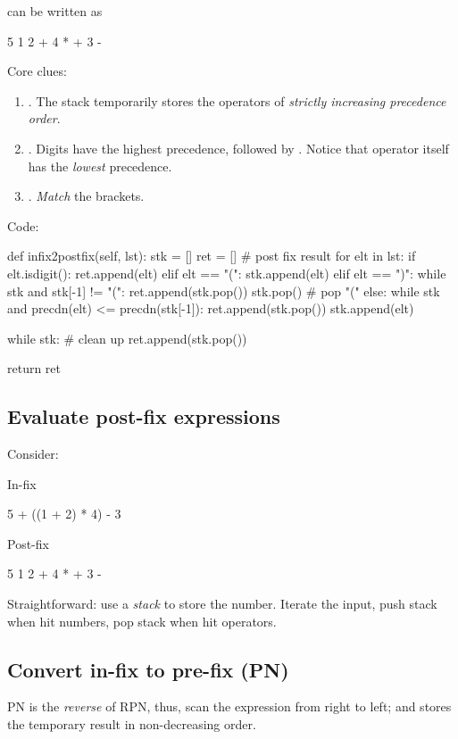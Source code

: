 can be written as
\begin{python}
5 1 2 + 4 * + 3 - 
\end{python}
Core clues:
\begin{enumerate}
\item {}. The stack temporarily stores the operators of \textit{strictly increasing precedence order}.
\item {}. Digits have the highest precedence, followed by \pyinline{*, /, +, (}. Notice that \pyinline{(} operator itself has the \textit{lowest} precedence.
\item {}. \textit{Match} the brackets. 
\end{enumerate}
Code:
\begin{python}
def infix2postfix(self, lst):
  stk = []
  ret = []  # post fix result
  for elt in lst:
    if elt.isdigit():
      ret.append(elt)
    elif elt == "(":
      stk.append(elt)
    elif elt == ")":
      while stk and stk[-1] != "(":
        ret.append(stk.pop())
      stk.pop()  # pop "("
    else:
      while stk and precdn(elt) <= precdn(stk[-1]):
        ret.append(stk.pop())
      stk.append(elt)

  while stk:  # clean up 
    ret.append(stk.pop())

  return ret
\end{python}

\subsection{Evaluate post-fix expressions}\label{section:evaluationPostFix}
Consider: 

In-fix
\begin{python}
5 + ((1 + 2) * 4) - 3
\end{python}

Post-fix
\begin{python}
5 1 2 + 4 * + 3 - 
\end{python}
Straightforward: use a \textit{stack} to store the number. Iterate the input, push
stack when hit numbers, pop stack when hit operators.

\subsection{Convert in-fix to pre-fix (PN)}
PN is the \textit{reverse} of RPN, thus, scan the expression from right to left; and  stores the temporary result in non-decreasing order. 



